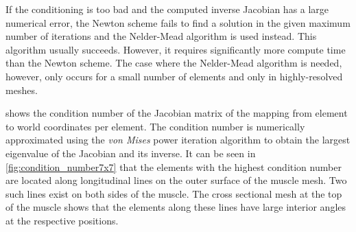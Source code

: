 If the conditioning is too bad and the computed inverse Jacobian has a large numerical error, the Newton scheme fails to find a solution in the given maximum number of iterations and the Nelder-Mead algorithm is used instead. This algorithm usually succeeds. However, it requires significantly more compute time than the Newton scheme. The case where the Nelder-Mead algorithm is needed, however, only occurs for a small number of elements and only in highly-resolved meshes.

 shows the condition number of the Jacobian matrix of the mapping from element to world coordinates per element. The condition number is numerically approximated using the \emph{von Mises} power iteration algorithm to obtain the largest eigenvalue of the Jacobian and its inverse.
It can be seen in \cref{fig:condition_number7x7} that the elements with the highest condition number are located along longitudinal lines on the outer surface of the muscle mesh. Two such lines exist on both sides of the muscle. The cross sectional mesh at the top of the muscle shows that the elements along these lines have large interior angles at the respective positions. 

